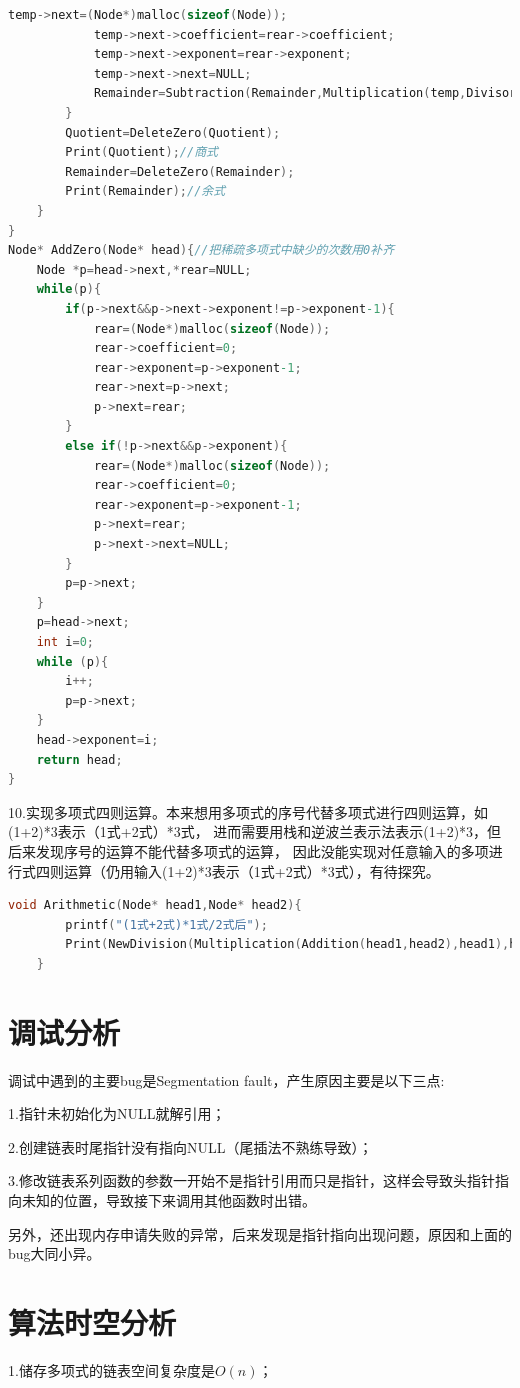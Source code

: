 \documentclass{ctexart}
\begin{document}
\begin{lstlisting}[language=C, caption=多项式除法]
            temp->next=(Node*)malloc(sizeof(Node));
            temp->next->coefficient=rear->coefficient;
            temp->next->exponent=rear->exponent;
            temp->next->next=NULL;
            Remainder=Subtraction(Remainder,Multiplication(temp,Divisor));
		}
        Quotient=DeleteZero(Quotient);
        Print(Quotient);//商式
        Remainder=DeleteZero(Remainder);
        Print(Remainder);//余式
    }
}
Node* AddZero(Node* head){//把稀疏多项式中缺少的次数用0补齐
    Node *p=head->next,*rear=NULL;
    while(p){
        if(p->next&&p->next->exponent!=p->exponent-1){
            rear=(Node*)malloc(sizeof(Node));
            rear->coefficient=0;
            rear->exponent=p->exponent-1;
            rear->next=p->next;
            p->next=rear;
        }
        else if(!p->next&&p->exponent){
            rear=(Node*)malloc(sizeof(Node));
            rear->coefficient=0;
            rear->exponent=p->exponent-1;
            p->next=rear;
			p->next->next=NULL;
        }
        p=p->next;
    }
    p=head->next;
    int i=0;
    while (p){
        i++;
        p=p->next;
    }
    head->exponent=i;
    return head;
}
	\end{lstlisting}
	10.实现多项式四则运算。本来想用多项式的序号代替多项式进行四则运算，如(1+2)*3表示（1式+2式）*3式，
	进而需要用栈和逆波兰表示法表示(1+2)*3，但后来发现序号的运算不能代替多项式的运算，
	因此没能实现对任意输入的多项进行式四则运算（仍用输入(1+2)*3表示（1式+2式）*3式），有待探究。
	\begin{lstlisting}[language=C, caption=给定的多项式四则运算]
	void Arithmetic(Node* head1,Node* head2){
		printf("(1式+2式)*1式/2式后");
		Print(NewDivision(Multiplication(Addition(head1,head2),head1),head2));
	}
	\end{lstlisting}
	
	\section{调试分析}
	调试中遇到的主要bug是Segmentation fault，产生原因主要是以下三点:

	1.指针未初始化为NULL就解引用；

	2.创建链表时尾指针没有指向NULL（尾插法不熟练导致）；

	3.修改链表系列函数的参数一开始不是指针引用而只是指针，这样会导致头指针指向未知的位置，导致接下来调用其他函数时出错。

另外，还出现内存申请失败的异常，后来发现是指针指向出现问题，原因和上面的bug大同小异。
	\section{算法时空分析}
	1.储存多项式的链表空间复杂度是$O(n)$；
\end{document}
